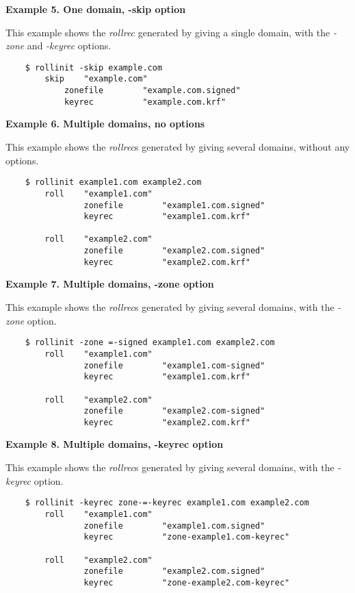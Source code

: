 {\bf Example 5.  One domain, -skip option}

This example shows the {\it rollrec} generated by giving  a
single domain, with the {\it -zone} and {\it -keyrec} options.

\begin{verbatim}
    $ rollinit -skip example.com
        skip    "example.com"
            zonefile        "example.com.signed"
            keyrec          "example.com.krf"
\end{verbatim}

{\bf Example 6.  Multiple domains, no options}

This example shows the {\it rollrec}s generated by giving 
several domains, without any options.

\begin{verbatim}
    $ rollinit example1.com example2.com
        roll    "example1.com"
                zonefile        "example1.com.signed"
                keyrec          "example1.com.krf"

        roll    "example2.com"
                zonefile        "example2.com.signed"
                keyrec          "example2.com.krf"
\end{verbatim}

{\bf Example 7.  Multiple domains, -zone option}

This example shows the {\it rollrec}s generated by giving 
several domains, with the {\it -zone} option.

\begin{verbatim}
    $ rollinit -zone =-signed example1.com example2.com
        roll    "example1.com"
                zonefile        "example1.com-signed"
                keyrec          "example1.com.krf"

        roll    "example2.com"
                zonefile        "example2.com-signed"
                keyrec          "example2.com.krf"
\end{verbatim}

{\bf Example 8.  Multiple domains, -keyrec option}

This example shows the {\it rollrec}s generated by giving 
several domains, with the {\it -keyrec} option.

\begin{verbatim}
    $ rollinit -keyrec zone-=-keyrec example1.com example2.com
        roll    "example1.com"
                zonefile        "example1.com.signed"
                keyrec          "zone-example1.com-keyrec"

        roll    "example2.com"
                zonefile        "example2.com.signed"
                keyrec          "zone-example2.com-keyrec"
\end{verbatim}

